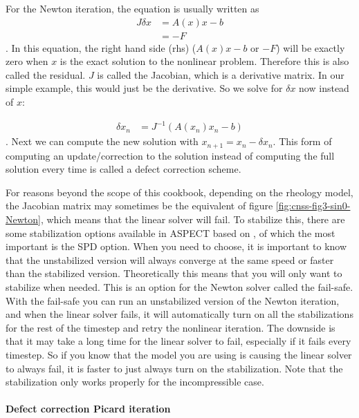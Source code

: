 For the Newton iteration, the equation is usually written as 
\begin{align}
    \label{sec:cnss:eq3:JdxAxx-b}
    J \delta x &= A(x) x - b \\
    &= -F
\end{align}. In this equation, the right hand side (rhs) ($A(x)x-b$ or $-F$) will be exactly 
zero when $x$ is the exact solution to the nonlinear problem. Therefore this is also called the 
residual. $J$ is called the Jacobian, which is a derivative matrix. In our simple example, 
this would just be the derivative. So we solve for $\delta x$ now instead of $x$:

\begin{align}
    \delta x_n &= J^{-1}\left(A(x_n) x_n - b\right)
\end{align}. Next we can compute the new solution with $x_{n+1} = x_n - \delta x_n$. This 
form of computing an update/correction to the solution instead of computing the full
solution every time is called a defect correction scheme.

For reasons beyond the scope of this cookbook, depending on the rheology model, the Jacobian 
matrix may sometimes be the equivalent of figure \ref{fig:cnss-fig3-sin0-Newton}, which 
means that the linear solver will fail. To stabilize this, there are some stabilization 
options available in ASPECT based on \cite{FBTGS19}, of which the most important is the 
SPD option. When you need to choose, it is important to know that the unstabilized version
will always converge at the same speed or faster than the stabilized version. Theoretically 
this means that you will only want to stabilize when needed. This is an option for the Newton
solver called the fail-safe. With the fail-safe you can run an unstabilized version of 
the Newton iteration, and when the linear solver fails, it will automatically turn on all
the stabilizations for the rest of the timestep and retry the nonlinear iteration. The downside
is that it may take a long time for the linear solver to fail, especially if it fails every
timestep. So if you know that the model you are using is causing the linear solver to always
fail, it is faster to just always turn on the stabilization.
Note that the stabilization only works properly for the incompressible case.


\paragraph{Defect correction Picard iteration}

